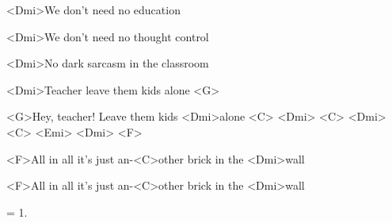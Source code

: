 

\zs
<Dmi>We don’t need no education

<Dmi>We don’t need no thought control

<Dmi>No dark sarcasm in the classroom

<Dmi>Teacher leave them kids alone <G>
\ks

\zr
<G>Hey, teacher! Leave them kids <Dmi>alone <C> <Dmi> <C> <Dmi> <C> <Emi> <Dmi> <F>

<F>All in all it's just an-<C>other brick in the <Dmi>wall

<F>All in all it's just an-<C>other brick in the <Dmi>wall
\kr

\zs
= 1.
\ks

\zr
\kr

\kp





